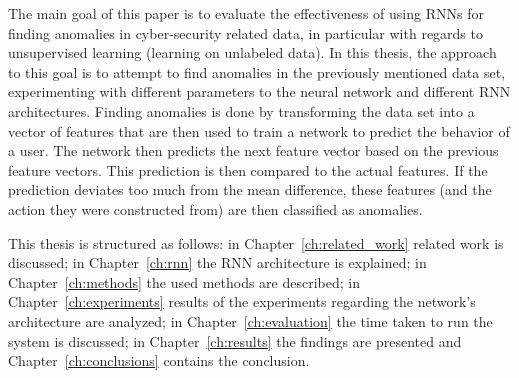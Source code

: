 The main goal of this paper is to evaluate the effectiveness of using RNNs for finding anomalies in cyber-security related data, in particular with regards to unsupervised learning (learning on unlabeled data). In this thesis, the approach to this goal is to attempt to find anomalies in the previously mentioned data set, experimenting with different parameters to the neural network and different RNN architectures. Finding anomalies is done by transforming the data set into a vector of features that are then used to train a network to predict the behavior of a user. The network then predicts the next feature vector based on the previous feature vectors. This prediction is then compared to the actual features. If the prediction deviates too much from the mean difference, these features (and the action they were constructed from) are then classified as anomalies.

This thesis is structured as follows: in Chapter~\ref{ch:related_work} related work is discussed; in Chapter~\ref{ch:rnn} the RNN architecture is explained; in Chapter~\ref{ch:methods} the used methods are described; in Chapter~\ref{ch:experiments} results of the experiments regarding the network's architecture are analyzed; in Chapter~\ref{ch:evaluation} the time taken to run the system is discussed; in Chapter~\ref{ch:results} the findings are presented and Chapter~\ref{ch:conclusions} contains the conclusion.